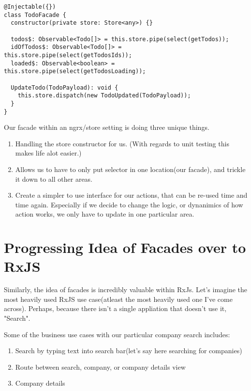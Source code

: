 \begin{lstlisting}[caption=todo.facade.ts]
@Injectable({})
class TodoFacade {
  constructor(private store: Store<any>) {}

  todos$: Observable<Todo[]> = this.store.pipe(select(getTodos));
  idOfTodos$: Observable<Todo[]> = this.store.pipe(select(getTodosIds));
  loaded$: Observable<boolean> = this.store.pipe(select(getTodosLoading));

  UpdateTodo(TodoPayload): void {
    this.store.dispatch(new TodoUpdated(TodoPayload));
  }
}  
\end{lstlisting}

Our facade within an ngrx/store setting is doing three unique things.
\begin{enumerate}
  \item Handling the store constructor for us. (With regards to unit testing this makes life alot easier.)
  \item Allows us to have to only put selector in one location(our facade), and trickle it down to all other areas. 
  \item Create a simpler to use interface for our actions, that can be re-used time and time again. Especially if we decide to change the logic, or dynanimics of how action works, we only have to update in one particular area. 
\end{enumerate}

\section{Progressing Idea of Facades over to RxJS}
Similarly, the idea of facades is incredibly valuable within RxJs. Let's imagine the most heavily used RxJS use case(atleast the most heavily used one I've come across). Perhaps, because there isn't a single appliation that doesn't use it, "Search".

Some of the business use cases with our particular company search includes: 
\begin{enumerate}
  \item Search by typing text into search bar(let's say here searching for companies)
  \item Route between search, company, or company details view 
  \item Company details
\end{enumerate}

